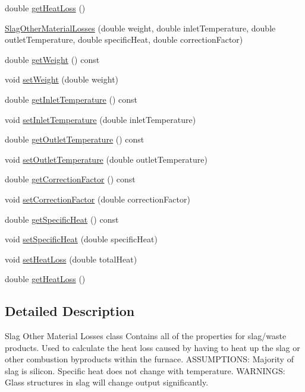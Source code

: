 \begin{DoxyCompactItemize}
\item 
double \hyperlink{class_slag_other_material_losses_a4c96a826ef6da38f4c27f7efd8b4a7ba}{get\+Heat\+Loss} ()
\item 
\hyperlink{class_slag_other_material_losses_a8b09bf5dd916a6c7df45b5bf2849e6b8}{Slag\+Other\+Material\+Losses} (double weight, double inlet\+Temperature, double outlet\+Temperature, double specific\+Heat, double correction\+Factor)
\item 
double \hyperlink{class_slag_other_material_losses_a9b62b86eb4ec919d70dd8899ef5d3513}{get\+Weight} () const
\item 
void \hyperlink{class_slag_other_material_losses_a230a178f2ead59cd498b620e4bb4910f}{set\+Weight} (double weight)
\item 
double \hyperlink{class_slag_other_material_losses_aebd0f1b7d6c4bf0deb8ce8a86c5a80a7}{get\+Inlet\+Temperature} () const
\item 
void \hyperlink{class_slag_other_material_losses_a47bb0a61de501e3e9b7bd2bf2651eb8c}{set\+Inlet\+Temperature} (double inlet\+Temperature)
\item 
double \hyperlink{class_slag_other_material_losses_a1c48f1a70aaf030451b7e350f3d6cd18}{get\+Outlet\+Temperature} () const
\item 
void \hyperlink{class_slag_other_material_losses_afae6aafff94d02926135fabf20a87070}{set\+Outlet\+Temperature} (double outlet\+Temperature)
\item 
double \hyperlink{class_slag_other_material_losses_a920bbc2da2ba90416e86573830eee2cb}{get\+Correction\+Factor} () const
\item 
void \hyperlink{class_slag_other_material_losses_a2aa985511888327bed6039da79c8958a}{set\+Correction\+Factor} (double correction\+Factor)
\item 
double \hyperlink{class_slag_other_material_losses_aa68e92bdf836a4112c55344f897f2649}{get\+Specific\+Heat} () const
\item 
void \hyperlink{class_slag_other_material_losses_a05488997f264a74afe3229250a286f92}{set\+Specific\+Heat} (double specific\+Heat)
\item 
void \hyperlink{class_slag_other_material_losses_a33d59aed5492ec2912615e93b6ff273e}{set\+Heat\+Loss} (double total\+Heat)
\item 
double \hyperlink{class_slag_other_material_losses_a4c96a826ef6da38f4c27f7efd8b4a7ba}{get\+Heat\+Loss} ()
\end{DoxyCompactItemize}


\subsection{Detailed Description}
Slag Other Material Losses class Contains all of the properties for slag/waste products. Used to calculate the heat loss caused by having to heat up the slag or other combustion byproducts within the furnace.\textquotesingle{} A\+S\+S\+U\+M\+P\+T\+I\+O\+NS\+: Majority of slag is silicon. Specific heat does not change with temperature. W\+A\+R\+N\+I\+N\+GS\+: Glass structures in slag will change output significantly. 

